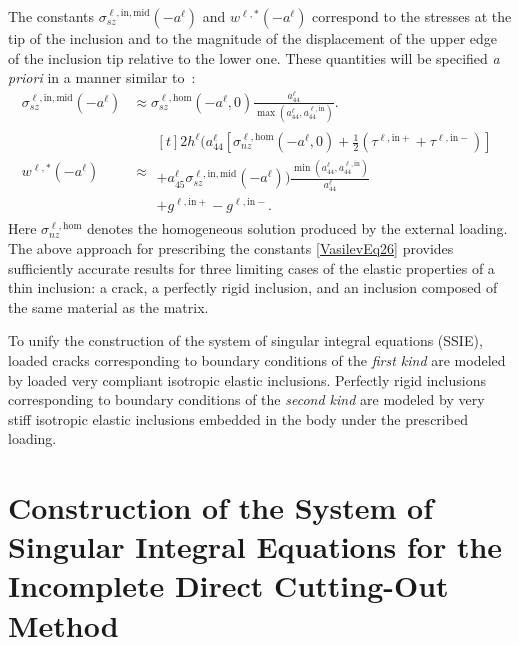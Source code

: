 The constants $\sigma_{sz}^{\ell,\mathrm{in,mid}}(-a^{\ell})$ and
$w^{\ell,*}(-a^{\ell})$ correspond to the stresses at the tip of the inclusion
and to the magnitude of the displacement of the upper edge of the inclusion tip
relative to the lower one. These quantities will be specified \emph{a priori}
in a manner similar to~\cite{Vasilev25,Vasilev29}:
\begin{equation}
	\label{VasilevEq26}
	\begin{aligned}
\sigma_{sz}^{\ell,\mathrm{in,mid}}(-a^{\ell})
&\approx
\sigma_{sz}^{\ell,\mathrm{hom}}(-a^{\ell},0)
\frac{a_{44}^{\ell}}{\max(a_{44}^{\ell},a_{44}^{\ell,\mathrm{in}})} .
\\
		w^{\ell,*}(-a^{\ell})
		&\approx
		\begin{multlined}[t]
		2h^{\ell}
		\Bigg(
		a_{44}^{\ell}
		\left[
		\sigma_{nz}^{\ell,\mathrm{hom}}(-a^{\ell},0)
		+\frac{1}{2}
		\left(
		\tau^{\ell,\mathrm{in}+}
		+
		\tau^{\ell,\mathrm{in}-}
		\right)
		\right]
		\\
		+
		a_{45}^{\ell}
		\sigma_{sz}^{\ell,\mathrm{in,mid}}(-a^{\ell})
		\Bigg)
		\frac{\min(a_{44}^{\ell},a_{44}^{\ell,\mathrm{in}})}{a_{44}^{\ell}}
		\\
		+
		g^{\ell,\mathrm{in}+}
		-
		g^{\ell,\mathrm{in}-}.
		\end{multlined}
	\end{aligned}
\end{equation}
%
Here $\sigma_{nz}^{\ell,\mathrm{hom}}$ denotes the homogeneous solution produced
by the external loading. The above approach for prescribing the constants
\eqref{VasilevEq26} provides sufficiently accurate results for three limiting
cases of the elastic properties of a thin inclusion: a crack, a perfectly rigid
inclusion, and an inclusion composed of the same material as the matrix.

To unify the construction of the system of singular integral equations (SSIE),
loaded cracks corresponding to boundary conditions of the \emph{first kind}
are modeled by loaded very compliant isotropic elastic inclusions. Perfectly
rigid inclusions corresponding to boundary conditions of the \emph{second
	kind} are modeled by very stiff isotropic elastic inclusions embedded in the
body under the prescribed loading.

\section{Construction of the System of Singular Integral Equations for the Incomplete Direct Cutting-Out Method}\label{VasilevSec7}

